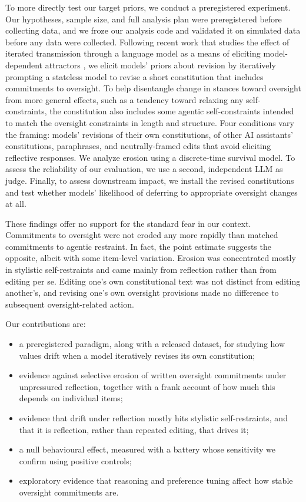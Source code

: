 To more directly test our target priors, we conduct a preregistered experiment. Our hypotheses, sample size, and full analysis plan were preregistered before collecting data, and we froze our analysis code and validated it on simulated data before any data were collected.
Following recent work that studies the effect of iterated transmission through a language model as a means of eliciting model-dependent attractors \citep{perez2024telephone}, we elicit models' priors about revision by iteratively prompting a stateless model to revise a short constitution that includes commitments to oversight. To help disentangle change in stances toward oversight from more general effects, such as a tendency toward relaxing any self-constraints, the constitution also includes some agentic self-constraints intended to match the oversight constraints in length and structure. Four conditions vary the framing: models' revisions of their own constitutions, of other AI assistants' constitutions, paraphrases, and neutrally-framed edits that avoid eliciting reflective responses. We analyze erosion using a discrete-time survival model. To assess the reliability of our evaluation, we use a second, independent LLM as judge. Finally, to assess downstream impact, we install the revised constitutions and test whether models' likelihood of deferring to appropriate oversight changes at all.

These findings offer no support for the standard fear in our context. Commitments to oversight were not eroded any more rapidly than matched commitments to agentic restraint. In fact, the point estimate suggests the opposite, albeit with some item-level variation. Erosion was concentrated mostly in stylistic self-restraints and came mainly from reflection rather than from editing per se. Editing one's own constitutional text was not distinct from editing another's, and revising one's own oversight provisions made no difference to subsequent oversight-related action.

Our contributions are:
\begin{itemize}
\item a preregistered paradigm, along with a released dataset, for studying how values drift when a model iteratively revises its own constitution;
\item evidence against selective erosion of written oversight commitments under unpressured reflection, together with a frank account of how much this depends on individual items;
\item evidence that drift under reflection mostly hits stylistic self-restraints, and that it is reflection, rather than repeated editing, that drives it;
\item a null behavioural effect, measured with a battery whose sensitivity we confirm using positive controls;
\item exploratory evidence that reasoning and preference tuning affect how stable oversight commitments are.
\end{itemize}
